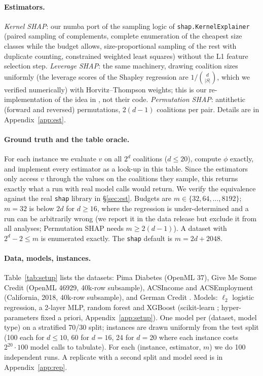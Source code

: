 \documentclass{article}
\begin{document}
\paragraph{Estimators.} \emph{Kernel SHAP}: our numba port of the sampling logic of \texttt{shap.KernelExplainer} (paired sampling of complements, complete enumeration of the cheapest size classes while the budget allows, size-proportional sampling of the rest with duplicate counting, constrained weighted least squares) without the L1 feature selection step. \emph{Leverage SHAP}: the same machinery, drawing coalition sizes uniformly (the leverage scores of the Shapley regression are $1/\binom{d}{|S|}$, which we verified numerically) with Horvitz--Thompson weights; this is our re-implementation of the idea in \citet{musco2024}, not their code. \emph{Permutation SHAP}: antithetic (forward and reversed) permutations, $2(d-1)$ coalitions per pair. Details are in Appendix~\ref{app:est}.

\paragraph{Ground truth and the table oracle.} For each instance we evaluate $v$ on all $2^d$ coalitions ($d\le20$), compute $\phi$ exactly, and implement every estimator as a look-up in this table. Since the estimators only access $v$ through the values on the coalitions they sample, this returns exactly what a run with real model calls would return. We verify the equivalence against the real \texttt{shap} library in \S\ref{sec:est}. Budgets are $m\in\{32,64,\dots,8192\}$; $m=32$ is below $2d$ for $d\ge16$, where the regression is under-determined and a run can be arbitrarily wrong (we report it in the data release but exclude it from all analyses; Permutation SHAP needs $m\ge2(d-1)$). A dataset with $2^d-2\le m$ is enumerated exactly. The \texttt{shap} default is $m=2d+2048$.

\paragraph{Data, models, instances.} Table~\ref{tab:setup} lists the datasets: Pima Diabetes (OpenML 37), Give Me Some Credit (OpenML 46929, 40k-row subsample), ACSIncome and ACSEmployment \citep{ding2021} (California, 2018, 40k-row subsample), and German Credit \citep{german}. Models: $\ell_2$ logistic regression, a 2-layer MLP, random forest \citep{breiman2001} and XGBoost \citep{chen2016xgb} (scikit-learn \citep{pedregosa2011}; hyper-parameters fixed a priori, Appendix~\ref{app:setup}). One model per (dataset, model type) on a stratified 70/30 split; instances are drawn uniformly from the test split (100 each for $d\le10$, 60 for $d{=}16$, 24 for $d{=}20$ where each instance costs $2^{20}\cdot100$ model calls to tabulate). For each (instance, estimator, $m$) we do 100 independent runs. A replicate with a second split and model seed is in Appendix~\ref{app:rep}.
\end{document}
